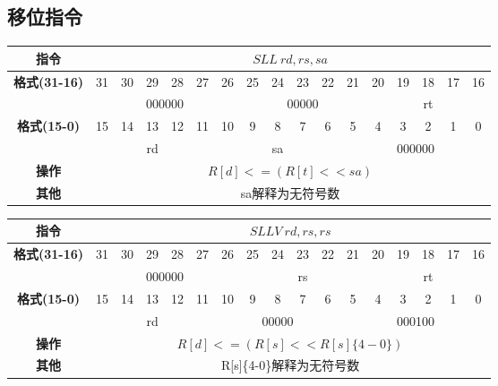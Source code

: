 \documentclass[11pt,utf8]{article}
\begin{document}
\subsection{移位指令}
\begin{center}
\begin{tabular}{|c|c|c|c|c|c|c|c|c|c|c|c|c|c|c|c|c|}
\hline
\textbf{指令} & \multicolumn{16}{c|}{$SLL~rd, rs, sa$} \\
\hline
\multirow{2}{*}{\textbf{格式(31-16)}} & 31 & 30 & 29 & 28 & 27 & 26 & 25 & 24 & 23 & 22 & 21 & 20 & 19 & 18 & 17 & 16 \\ 
\cline{2-17}
& \multicolumn{6}{c|}{000000} & \multicolumn{5}{c|}{00000} & \multicolumn{5}{c|}{rt}\\
\hline
\multirow{2}{*}{\textbf{格式(15-0)}} & 15 & 14 & 13 & 12 & 11 & 10 & 9 & 8 & 7 & 6 & 5 & 4 & 3 & 2 & 1 & 0 \\
\cline{2-17}
& \multicolumn{5}{c|}{rd} & \multicolumn{5}{c|}{sa} & \multicolumn{6}{c|}{000000}\\
\hline
\textbf{操作} & \multicolumn{16}{c|}{$R[d]<=(R[t]<<sa)$} \\
\hline
\textbf{其他} & \multicolumn{16}{c|}{sa解释为无符号数} \\
\hline
\end{tabular}
\end{center}

\begin{center}
\begin{tabular}{|c|c|c|c|c|c|c|c|c|c|c|c|c|c|c|c|c|}
\hline
\textbf{指令} & \multicolumn{16}{c|}{$SLLV~rd, rs, rs$} \\
\hline
\multirow{2}{*}{\textbf{格式(31-16)}} & 31 & 30 & 29 & 28 & 27 & 26 & 25 & 24 & 23 & 22 & 21 & 20 & 19 & 18 & 17 & 16 \\ 
\cline{2-17}
& \multicolumn{6}{c|}{000000} & \multicolumn{5}{c|}{rs} & \multicolumn{5}{c|}{rt}\\
\hline
\multirow{2}{*}{\textbf{格式(15-0)}} & 15 & 14 & 13 & 12 & 11 & 10 & 9 & 8 & 7 & 6 & 5 & 4 & 3 & 2 & 1 & 0 \\
\cline{2-17}
& \multicolumn{5}{c|}{rd} & \multicolumn{5}{c|}{00000} & \multicolumn{6}{c|}{000100}\\
\hline
\textbf{操作} & \multicolumn{16}{c|}{$R[d]<=(R[s]<<R[s]\{4-0\})$} \\
\hline
\textbf{其他} & \multicolumn{16}{c|}{R[s]\{4-0\}解释为无符号数} \\
\hline
\end{tabular}
\end{center}
\end{document}
